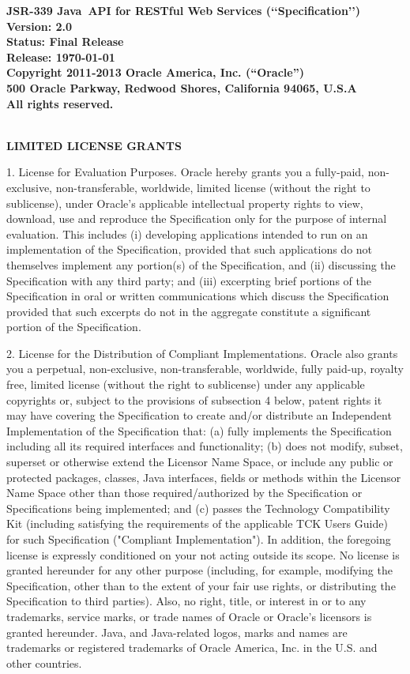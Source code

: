 \begin{flushleft}

{\bfseries JSR-339 Java\texttrademark\ API for RESTful Web Services (\lq\lq Specification\rq\rq)\\
Version: 2.0 \\
Status: Final Release \\
Release: \today\\ 
Copyright 2011-2013 Oracle America, Inc. (``Oracle'') \\
500 Oracle Parkway, Redwood Shores, California 94065, U.S.A\\ 
All rights reserved.
}

\mbox{}\\
{\bfseries LIMITED LICENSE GRANTS}

1. License for Evaluation Purposes. Oracle hereby grants you a fully-paid, non-exclusive, non-transferable, worldwide, limited license (without the right to sublicense), under Oracle's  applicable intellectual property rights to view, download, use and reproduce the Specification only for the purpose of internal evaluation.  This includes (i) developing applications intended to run on an implementation of the Specification, provided that such applications do not themselves implement any portion(s) of the Specification, and (ii) discussing the Specification with any third party; and (iii) excerpting brief portions of the Specification in oral or written communications which discuss the Specification provided that such excerpts do not in the aggregate constitute a significant portion of the Specification.

2. License for the Distribution of Compliant Implementations. Oracle  also grants you a perpetual, non-exclusive, non-transferable, worldwide, fully paid-up, royalty free, limited license (without the right to sublicense) under any applicable copyrights or, subject to the provisions of subsection 4 below, patent rights it may have covering the Specification to create and/or distribute an Independent Implementation of the Specification that: (a) fully implements the Specification including all its required interfaces and functionality; (b) does not modify, subset, superset or otherwise extend the Licensor Name Space, or include any public or protected packages, classes, Java interfaces, fields or methods within the Licensor Name Space other than those required/authorized by the Specification or Specifications being implemented; and (c) passes the Technology Compatibility Kit (including satisfying the requirements of the applicable TCK Users Guide) for such Specification ("Compliant Implementation").  In addition, the foregoing license is expressly conditioned on your not acting outside its scope.  No license is granted hereunder for any other purpose (including, for example, modifying the Specification, other than to the extent of your fair use rights, or distributing the Specification to third parties).  Also, no right, title, or interest in or to any trademarks, service marks, or trade names of Oracle or Oracle's licensors is granted hereunder.  Java, and Java-related logos, marks and names are trademarks or registered trademarks of Oracle America, Inc. in the U.S. and other countries.


\end{flushleft}
